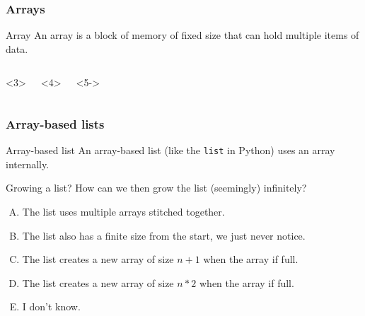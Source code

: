 \begin{frame}
	\frametitle{Arrays}
	\begin{block}{Array}
		An array is a block of memory of fixed size that can hold multiple items of data.
	\end{block}	
	\pause
	\begin{columns}
		\vspace{10pt}
		
		\pause
		\begin{onlyenv}<3>

			
		\end{onlyenv}
		\begin{onlyenv}<4>

			
		\end{onlyenv}
		\begin{onlyenv}<5->

			
		\end{onlyenv}
	\end{columns}
\end{frame}

\begin{frame}
	\frametitle{Array-based lists}
	\begin{block}{Array-based list}
		An array-based list (like the \texttt{list} in Python) uses an array internally.
	\end{block}
	\begin{questionblock}{Growing a list?}
		How can we then grow the list (seemingly) infinitely?
		\begin{enumerate}[A.]
			\item The list uses multiple arrays stitched together.
			\item The list also has a finite size from the start, we just never notice.
			\item The list creates a new array of size $n+1$ when the array if full.
			\item The list creates a new array of size $n*2$ when the array if full.
			\item I don't know.
		\end{enumerate}
	\end{questionblock}
\end{frame}

